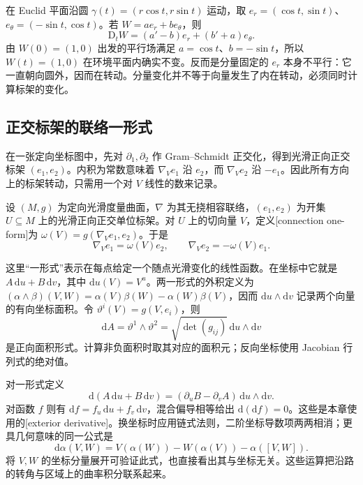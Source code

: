 \begin{example}
	\label{g1:exm:parallel-polar-frame}
	在 Euclid 平面沿圆 \(\gamma(t)=(r\cos t,r\sin t)\) 运动，取 \(e_r=(\cos t,\sin t)\)、\(e_\theta=(-\sin t,\cos t)\)。若 \(W=a e_r+b e_\theta\)，则
	\[
		\mathrm{D}_tW=(a'-b)e_r+(b'+a)e_\theta.
	\]
	由 \(W(0)=(1,0)\) 出发的平行场满足 \(a=\cos t\)、\(b=-\sin t\)，所以 \(W(t)=(1,0)\) 在环境平面内确实不变。反而是分量固定的 \(e_r\) 本身不平行：它一直朝向圆外，因而在转动。分量变化并不等于向量发生了内在转动，必须同时计算标架的变化。
\end{example}

\subsection{正交标架的联络一形式}
\label{g1:subsec:0901:03}

在一张定向坐标图中，先对 \(\partial_1,\partial_2\) 作 Gram--Schmidt 正交化，得到光滑正向正交标架 \((e_1,e_2)\)。内积为常数意味着 \(\nabla_Ve_1\) 沿 \(e_2\)，而 \(\nabla_Ve_2\) 沿 \(-e_1\)。因此所有方向上的标架转动，只需用一个对 \(V\) 线性的数来记录。

\begin{definition}
	\label{g1:def:surface-connection-form}
	设 \((M,g)\) 为定向光滑度量曲面，\(\nabla\) 为其无挠相容联络，\((e_1,e_2)\) 为开集 \(U\subseteq M\) 上的光滑正向正交单位标架。对 \(U\) 上的切向量 \(V\)，定义[connection one-form]为 \(\omega(V)=g(\nabla_Ve_1,e_2)\)。于是
	\begin{equation}
		\label{g1:eq:surface-frame-connection}
		\nabla_Ve_1=\omega(V)e_2,\qquad \nabla_Ve_2=-\omega(V)e_1.
	\end{equation}
\end{definition}

这里“一形式”表示在每点给定一个随点光滑变化的线性函数。在坐标中它就是 \(A\,\mathrm{d}u+B\,\mathrm{d}v\)，其中 \(\mathrm{d}u(V)=V^u\)。两一形式的外积定义为 \((\alpha\wedge\beta)(V,W)=\alpha(V)\beta(W)-\alpha(W)\beta(V)\)，因而 \(\mathrm{d}u\wedge\mathrm{d}v\) 记录两个向量的有向坐标面积。令 \(\vartheta^i(V)=g(V,e_i)\)，则
\[
	\mathrm{d}A=\vartheta^1\wedge\vartheta^2=\sqrt{\det(g_{ij})}\,\mathrm{d}u\wedge\mathrm{d}v
\]
是正向面积形式。计算非负面积时取其对应的面积元；反向坐标使用 Jacobian 行列式的绝对值。

对一形式定义
\[
	\mathrm{d}(A\,\mathrm{d}u+B\,\mathrm{d}v)
	=(\partial_uB-\partial_vA)\,\mathrm{d}u\wedge\mathrm{d}v.
\]
对函数 \(f\) 则有 \(\mathrm{d}f=f_u\,\mathrm{d}u+f_v\,\mathrm{d}v\)，混合偏导相等给出 \(\mathrm{d}(\mathrm{d}f)=0\)。这些是本章使用的[exterior derivative]。换坐标时应用链式法则，二阶坐标导数项两两相消；更具几何意味的同一公式是
\[
	\mathrm{d}\alpha(V,W)=V(\alpha(W))-W(\alpha(V))-\alpha([V,W]).
\]
将 \(V,W\) 的坐标分量展开可验证此式，也直接看出其与坐标无关。这些运算把沿路的转角与区域上的曲率积分联系起来。

